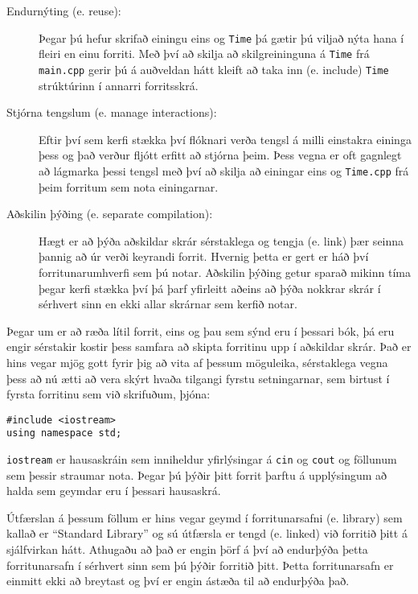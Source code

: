 \begin{description}

\item[Endurnýting (e. reuse):]  Þegar þú hefur skrifað einingu eins og {\tt Time} þá gætir þú viljað nýta hana í fleiri en einu forriti.
Með því að skilja að skilgreininguna á {\tt Time} frá {\tt main.cpp} gerir þú á auðveldan hátt kleift að taka inn (e. include)
{\tt Time} strúktúrinn í annarri forritsskrá.

\item[Stjórna tengslum (e. manage interactions):]  Eftir því sem kerfi stækka því flóknari verða tengsl á milli einstakra eininga þess
og það verður fljótt erfitt að stjórna þeim.
Þess vegna er oft gagnlegt að lágmarka þessi tengsl með því að skilja að einingar eins og {\tt Time.cpp} frá þeim forritum sem nota einingarnar.

\item[Aðskilin þýðing (e. separate compilation):]  Hægt er að þýða aðskildar skrár sérstaklega og tengja (e. link) þær seinna þannig að úr verði keyrandi forrit.
Hvernig þetta er gert er háð því forritunarumhverfi sem þú notar.
Aðskilin þýðing getur sparað mikinn tíma þegar kerfi stækka því þá þarf yfirleitt aðeins að þýða nokkrar skrár í sérhvert sinn en ekki allar skrárnar sem kerfið notar.

\end{description}

Þegar um er að ræða lítil forrit, eins og þau sem sýnd eru í þessari bók, þá eru engir sérstakir kostir þess samfara að skipta forritinu upp í aðskildar skrár.
Það er hins vegar mjög gott fyrir þig að vita af þessum möguleika, 
sérstaklega vegna þess að nú ætti að vera skýrt hvaða tilgangi fyrstu setningarnar, sem birtust í fyrsta forritinu sem við skrifuðum, þjóna:

\begin{verbatim}
#include <iostream>
using namespace std;
\end{verbatim}
%
{\tt iostream} er hausaskráin sem inniheldur yfirlýsingar á {\tt cin} og {\tt cout} og föllunum sem þessir straumar nota.
Þegar þú þýðir þitt forrit þarftu á upplýsingum að halda sem geymdar eru í þessari hausaskrá.

Útfærslan á þessum föllum er hins vegar geymd í forritunarsafni (e. library) sem kallað er ``Standard Library'' og sú útfærsla er tengd (e. linked) við forritið þitt á sjálfvirkan hátt.
Athugaðu að það er engin þörf á því að endurþýða þetta forritunarsafn í sérhvert sinn sem þú þýðir forritið þitt.
Þetta forritunarsafn er einmitt ekki að breytast og því er engin ástæða til að endurþýða það.

